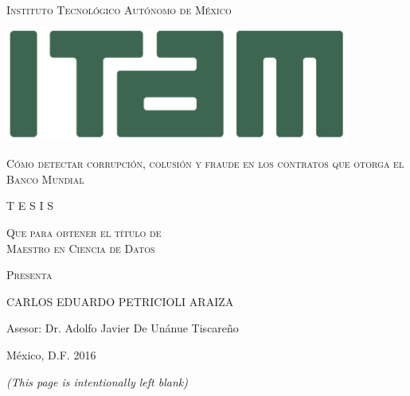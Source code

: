 
\thispagestyle{empty}
\begin{center}
\Large \scshape Instituto Tecnológico Autónomo de México \\
\end{center}

\vspace{4mm}



\begin{center}
\includegraphics[scale=.72]{../img/ITAM.jpg}


\vspace{15mm}


\scshape \Large Cómo detectar corrupción, colusión y fraude en los contratos que otorga el Banco Mundial

\vfill
\scshape \large T E S I S 


\vspace{3mm}
\scshape Que para obtener el título de \\

\vspace{3mm}
\scshape Maestro en Ciencia de Datos

\vspace{3mm}
\scshape Presenta

\vspace{4mm}
\Large CARLOS EDUARDO PETRICIOLI ARAIZA


\vspace{5mm}

\large Asesor: Dr.  Adolfo Javier De Unánue Tiscareño
\end{center}
\vspace{10mm}
México, D.F.   \hfill       2016


\newpage

\thispagestyle{empty}

\begin{flushright}
\textit{(This page is intentionally left blank)}
\end{flushright}

\newpage
\thispagestyle{plain}
\setcounter{page}{1}


